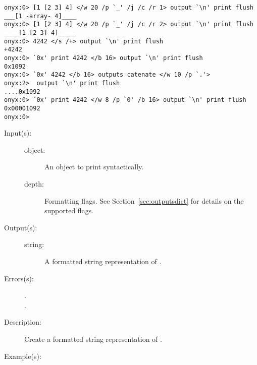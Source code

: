 \begin{description}
\begin{description}
\begin{verbatim}
onyx:0> [1 [2 3] 4] </w 20 /p `_' /j /c /r 1> output `\n' print flush
___[1 -array- 4]____
onyx:0> [1 [2 3] 4] </w 20 /p `_' /j /c /r 2> output `\n' print flush
____[1 [2 3] 4]_____
onyx:0> 4242 </s /+> output `\n' print flush
+4242
onyx:0> `0x' print 4242 </b 16> output `\n' print flush
0x1092
onyx:0> `0x' 4242 </b 16> outputs catenate </w 10 /p `.'>
onyx:2>  output `\n' print flush
....0x1092
onyx:0> `0x' print 4242 </w 8 /p `0' /b 16> output `\n' print flush
0x00001092
onyx:0>
		\end{verbatim}
	\end{description}
\label{systemdict:outputs}
\item[{\onyxop{object flags}{outputs}{string}}: ]
	\begin{description}\item[]
	\item[Input(s): ]
		\begin{description}\item[]
		\item[object: ]
			An object to print syntactically.
		\item[depth: ]
			Formatting flags.  See Section~\ref{sec:outputsdict} for
			details on the supported flags.
		\end{description}
	\item[Output(s): ]
		\begin{description}\item[]
		\item[string: ]
			A formatted string representation of .
		\end{description}
	\item[Errors(s): ]
		\begin{description}\item[]
		\item[.]
		\item[.]
		\end{description}
	\item[Description: ]
		Create a formatted string representation of .
	\item[Example(s): ]\begin{verbatim}


\end{verbatim}
\end{description}
\end{description}
